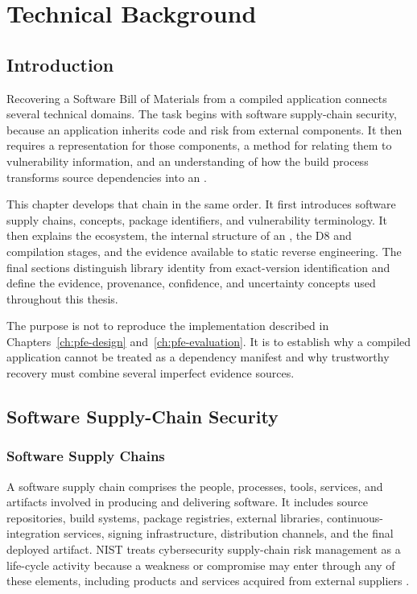 \chapter{Technical Background}
\label{ch:pfe-background}

\section{Introduction}

Recovering a Software Bill of Materials from a compiled \Android application
connects several technical domains. The task begins with software
supply-chain security, because an application inherits code and risk from
external components. It then requires a representation for those components,
a method for relating them to vulnerability information, and an understanding
of how the \Android build process transforms source dependencies into an
\APK.

This chapter develops that chain in the same order. It first introduces
software supply chains, \SBOM concepts, package identifiers, and vulnerability
terminology. It then explains the \Android ecosystem, the internal structure
of an \APK, the D8 and \Reight compilation stages, and the evidence available
to static reverse engineering. The final sections distinguish library
identity from exact-version identification and define the evidence,
provenance, confidence, and uncertainty concepts used throughout this thesis.

The purpose is not to reproduce the implementation described in
Chapters~\ref{ch:pfe-design} and~\ref{ch:pfe-evaluation}. It is to establish
why a compiled application cannot be treated as a dependency manifest and why
trustworthy recovery must combine several imperfect evidence sources.

\section{Software Supply-Chain Security}

\subsection{Software Supply Chains}

A software supply chain comprises the people, processes, tools, services, and
artifacts involved in producing and delivering software. It includes source
repositories, build systems, package registries, external libraries,
continuous-integration services, signing infrastructure, distribution
channels, and the final deployed artifact. NIST treats cybersecurity
supply-chain risk management as a life-cycle activity because a weakness or
compromise may enter through any of these elements, including products and
services acquired from external suppliers \cite{nist2022csc}.

